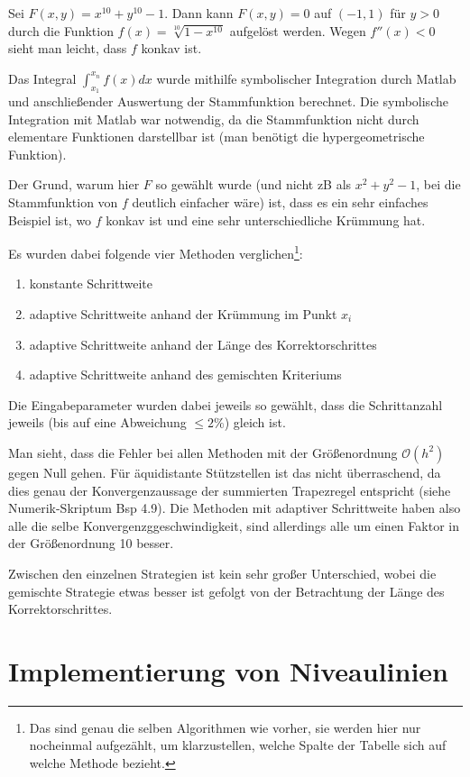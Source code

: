 \documentclass[a4paper,11pt,bibliography=totoc,listof=totoc,headinclude=true,cleardoublepage=empty,oneside]{scrartcl}
\begin{document}
Sei $F(x,y)= x^{10} +y^{10}-1$. Dann kann $F(x,y)=0$ auf $(-1,1)$ für $y>0$ durch die Funktion $f(x)= \sqrt[10]{1-x^{10}}$ aufgelöst werden. Wegen $f''(x) <0$ sieht man leicht, dass $f$ konkav ist. 

Das Integral $ \int_{x_1}^{x_n}\!\! f(x) dx$ wurde mithilfe symbolischer Integration durch Matlab und anschließender Auswertung der Stammfunktion berechnet. Die symbolische Integration mit Matlab war notwendig, da die Stammfunktion nicht durch elementare Funktionen darstellbar ist (man benötigt die hypergeometrische Funktion). 

Der Grund, warum hier $F$ so gewählt wurde (und nicht zB als $x^2+y^2-1$, bei die Stammfunktion von $f$ deutlich einfacher wäre) ist, dass es ein sehr einfaches Beispiel ist, wo $f$ konkav ist und eine sehr unterschiedliche Krümmung hat. 

Es wurden dabei folgende vier Methoden verglichen\footnote{Das sind genau die selben Algorithmen wie vorher, sie werden hier nur nocheinmal aufgezählt, um klarzustellen, welche Spalte der Tabelle sich auf welche Methode bezieht.}:
\begin{enumerate}
	\item konstante Schrittweite
	\item adaptive Schrittweite anhand der Krümmung im Punkt $x_i$
	\item adaptive Schrittweite anhand der Länge des Korrektorschrittes
	\item adaptive Schrittweite anhand des gemischten Kriteriums
\end{enumerate}
Die Eingabeparameter wurden dabei jeweils so gewählt, dass die Schrittanzahl jeweils (bis auf eine Abweichung $\le 2\%$) gleich ist.

Man sieht, dass die Fehler bei allen Methoden mit der Größenordnung $\mathcal{O}(h^2)$ gegen Null gehen. Für äquidistante Stützstellen ist das nicht überraschend, da dies genau der Konvergenzaussage der summierten Trapezregel entspricht (siehe Numerik-Skriptum Bsp 4.9). Die Methoden mit adaptiver Schrittweite haben also alle die selbe Konvergenzggeschwindigkeit, sind allerdings alle um einen Faktor in der Größenordnung 10 besser.

Zwischen den einzelnen Strategien ist kein sehr großer Unterschied, wobei die gemischte Strategie etwas besser ist gefolgt von der Betrachtung der Länge des Korrektorschrittes. 



\section{Implementierung von Niveaulinien}
\end{document}
